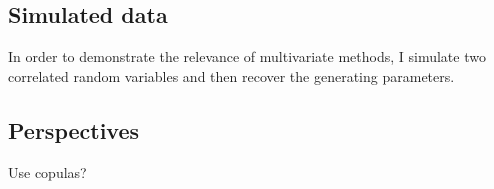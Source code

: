 \subsection{Simulated data}
In order to demonstrate the relevance of multivariate methods, I simulate two correlated random variables and then recover the generating parameters.

\subsection{Perspectives}

Use copulas?